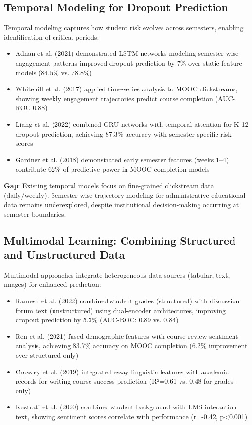 \subsection{Temporal Modeling for Dropout Prediction}

Temporal modeling captures how student risk evolves across semesters, enabling identification of critical periods:

\begin{itemize}
\item Adnan et al. (2021) demonstrated LSTM networks modeling semester-wise engagement patterns improved dropout prediction by 7\% over static feature models (84.5\% vs. 78.8\%)
\item Whitehill et al. (2017) applied time-series analysis to MOOC clickstreams, showing weekly engagement trajectories predict course completion (AUC-ROC 0.88)
\item Liang et al. (2022) combined GRU networks with temporal attention for K-12 dropout prediction, achieving 87.3\% accuracy with semester-specific risk scores
\item Gardner et al. (2018) demonstrated early semester features (weeks 1--4) contribute 62\% of predictive power in MOOC completion models
\end{itemize}

\textbf{Gap}: Existing temporal models focus on fine-grained clickstream data (daily/weekly). Semester-wise trajectory modeling for administrative educational data remains underexplored, despite institutional decision-making occurring at semester boundaries.

\subsection{Multimodal Learning: Combining Structured and Unstructured Data}

Multimodal approaches integrate heterogeneous data sources (tabular, text, images) for enhanced prediction:

\begin{itemize}
\item Ramesh et al. (2022) combined student grades (structured) with discussion forum text (unstructured) using dual-encoder architectures, improving dropout prediction by 5.3\% (AUC-ROC: 0.89 vs. 0.84)
\item Ren et al. (2021) fused demographic features with course review sentiment analysis, achieving 83.7\% accuracy on MOOC completion (6.2\% improvement over structured-only)
\item Crossley et al. (2019) integrated essay linguistic features with academic records for writing course success prediction (R²=0.61 vs. 0.48 for grades-only)
\item Kastrati et al. (2020) combined student background with LMS interaction text, showing sentiment scores correlate with performance (r=-0.42, p<0.001)
\end{itemize}

